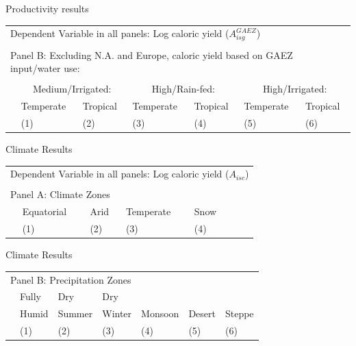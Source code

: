 \documentclass[10pt, xcolor=dvipsnames]{beamer}
\begin{document}
\begin{frame}{Productivity results}

{\footnotesize
\begin{tabularx}{\textwidth}{lXXXXXX}
\midrule
\multicolumn{7}{l}{Dependent Variable in all panels: Log caloric yield ($A^{GAEZ}_{isg}$)} \\ \\
\multicolumn{7}{l}{Panel B: Excluding N.A. and Europe, caloric yield based on GAEZ input/water use:} \\ \\
 & \multicolumn{2}{c}{Medium/Irrigated:} & \multicolumn{2}{c}{High/Rain-fed:} & \multicolumn{2}{c}{High/Irrigated:}\\ \cmidrule(lr){2-3} \cmidrule(lr){4-5} \cmidrule(lr){6-7} 
 & Temperate & Tropical & Temperate  & Tropical  & Temperate  & Tropical \\
 & (1) & (2) & (3) & (4) & (5) & (6) \\
\midrule

\midrule
\end{tabularx}
}

\end{frame}


\begin{frame}{Climate Results}\label{climatereg}

{\footnotesize
\begin{tabularx}{\textwidth}{lXXXXXX}
\midrule
\multicolumn{7}{l}{Dependent Variable in all panels: Log caloric yield ($A_{isc}$)} \\ \\
\multicolumn{7}{l}{Panel A: Climate Zones} \\
 & Equatorial & Arid & Temperate & Snow  &     &   \\
 & (1) & (2) & (3) & (4) &  & \\
\midrule

\midrule
\end{tabularx}
}

\hfill \hyperlink{robustness}{}
\end{frame}

\begin{frame}{Climate Results}

{\footnotesize
\begin{tabularx}{\textwidth}{lXXXXXX}
\midrule
\multicolumn{7}{l}{Panel B: Precipitation Zones} \\
& Fully     & Dry         & Dry        &              &            & \\
& Humid & Summer & Winter & Monsoon & Desert & Steppe \\
 & (1) & (2) & (3) & (4) & (5) & (6) \\
\midrule

\midrule
\end{tabularx}
}

\end{frame}
\end{document}
